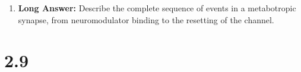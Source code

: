 \begin{enumerate}[label=\textbf{Q2.8.\arabic*}]
      \item \textbf{Long Answer:} Describe the complete sequence of events in a metabotropic synapse, from neuromodulator binding to the resetting of the channel. \\
\end{enumerate}

\squigglyline


\section*{2.9}

